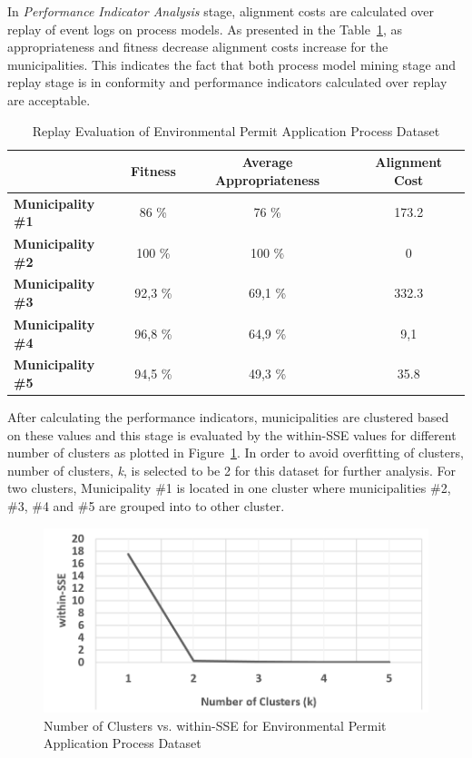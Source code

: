 In \textit{Performance Indicator Analysis} stage, alignment costs are calculated over replay of event logs on process models. As presented in the Table~\ref{table:coselog-wabo-replay}, as appropriateness and fitness decrease alignment costs increase for the municipalities. This indicates the fact that both process model mining stage and replay stage is in conformity and performance indicators calculated over replay are acceptable.
\begin{table}[]
\centering
\caption{Replay Evaluation of Environmental Permit Application Process Dataset}
\label{table:coselog-wabo-replay}
\begin{tabular}{lccc}
\hline
 & {\bf Fitness} & {\bf Average Appropriateness} & {\bf Alignment Cost} \\ \hline
{\bf Municipality \#1} & 86 \% & 76 \% & 173.2 \\ \hline
{\bf Municipality \#2} & 100 \% & 100 \% & 0 \\ \hline
{\bf Municipality \#3} & 92,3 \% & 69,1 \% & 332.3 \\ \hline
{\bf Municipality \#4} & 96,8 \% & 64,9 \% & 9,1 \\ \hline
{\bf Municipality \#5} & 94,5 \% & 49,3 \% & 35.8 \\ \hline
\end{tabular}
\end{table}

After calculating the performance indicators, municipalities are clustered based on these values and this stage is evaluated by the within-SSE values for different number of clusters as plotted in Figure~\ref{fig:coselog-wabo-cluster-sse-plot}. In order to avoid overfitting of clusters, number of clusters, \textit{k}, is selected to be 2 for this dataset for further analysis. For two clusters, Municipality \#1 is located in one cluster where municipalities \#2, \#3, \#4 and \#5 are grouped into to other cluster.
\begin{figure}
	\centering
	\includegraphics[width=.7\textwidth]{5_results_discussions/coselog-wabo/cluster-sse-plot}
	\caption{Number of Clusters vs. within-SSE for Environmental Permit Application Process Dataset}
  \label{fig:coselog-wabo-cluster-sse-plot}
\end{figure}

